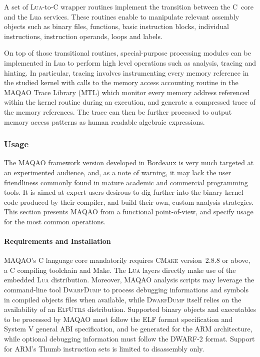 \documentclass[11pt, a4paper, twoside]{montblanc2}
\def\cmake{\textsc{CMake}\xspace}
\def\lua{\textsc{Lua}\xspace}
\def\dd{\textsc{DwarfDump}\xspace}
\def\elfutils{\textsc{ElfUtils}\xspace}
\begin{document}
A set of \lua-to-C wrapper routines implement the transition between the C~core and the Lua 
services. These routines enable to manipulate relevant assembly objects such as binary files, 
functions, basic instruction blocks, individual instructions, instruction operands, loops and 
labels. 

On top of those transitional routines, special-purpose processing modules can be implemented in Lua 
to perform high level operations such as analysis, tracing and hinting. In particular, tracing 
involves instrumenting every memory reference in the studied kernel with calls to the memory access 
accounting routine in the MAQAO Trace Library (MTL) which monitor every memory address referenced 
within the kernel routine during an execution, and generate a compressed trace of the memory 
references. The trace can then be further processed to output memory access patterns as human 
readable algebraic expressions.

\subsubsection{Usage}

The MAQAO framework version developed in Bordeaux is very much targeted at an experimented audience, 
and, as a note of warning, it may lack the user friendliness commonly found in mature academic and 
commercial programming tools. It is aimed at expert users desirous to dig further into the binary 
kernel code produced by their compiler, and build their own, custom analysis strategies.
This section presents MAQAO from a functional point-of-view, and specify usage for the most common
operations.

\paragraph{Requirements and Installation}

MAQAO's C language core mandatorily requires \cmake version~2.8.8 or above, a C compiling toolchain 
and Make. The \lua layers directly make use of the embedded \lua distribution. Moreover, MAQAO 
analysis scripts may leverage the command-line tool \dd to process debugging informations and 
symbols in compiled objects files when available, while \dd itself relies on the availability of an 
\elfutils distribution. Supported binary objects and executables to be processed by MAQAO must 
follow the ELF format specification and System V general ABI specification, and be generated for the 
ARM architecture, while optional debugging information must follow the DWARF-2 format. Support for 
ARM's Thumb instruction sets is limited to disassembly only.
\end{document}
